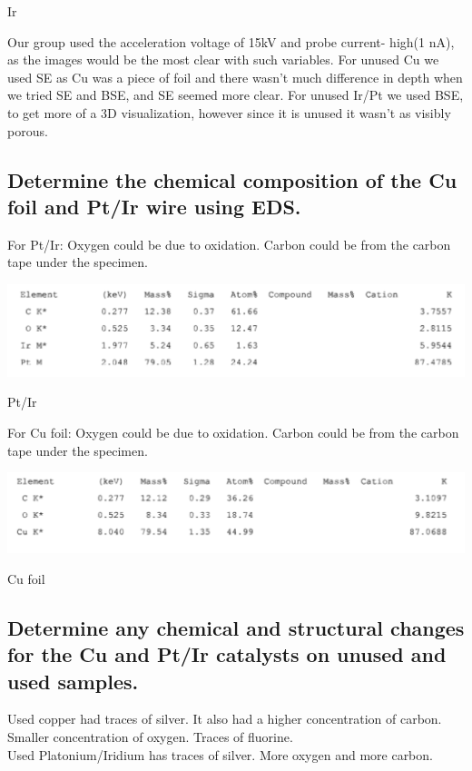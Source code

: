 Ir\documentclass{article}
\begin{document}
Our group used the acceleration voltage of 15kV and probe current- high(1 nA), as the images would be the most clear with such variables. For unused Cu we used SE as Cu was a piece of foil  and there wasn’t much difference in depth when we tried SE and BSE, and SE seemed more clear. For unused Ir/Pt we used BSE, to get more of a 3D visualization, however since it is unused it wasn’t as visibly porous. 

\subsection{Determine the chemical composition of the Cu foil and Pt/Ir wire using EDS.}

For Pt/Ir:
Oxygen could be due to oxidation.
Carbon could be from the carbon tape under the specimen. 

\begin{center}
\includegraphics[width=\textwidth,height=\textheight,keepaspectratio]{pictures/ptir.png}
\caption{Pt/Ir}
\end{center}
For Cu foil:
Oxygen could be due to oxidation.
Carbon could be from the carbon tape under the specimen. 

\begin{center}
\includegraphics[width=\textwidth,height=\textheight,keepaspectratio]{CUfoil.png}
\caption{Cu foil}
\end{center}
\subsection{Determine any chemical and structural changes for the Cu and Pt/Ir catalysts
on unused and used samples.}

Used copper had traces of silver. It also had a higher concentration of carbon. Smaller concentration of oxygen. Traces of fluorine. \\

Used Platonium/Iridium has traces of silver. More oxygen and more carbon. \\
\end{document}

